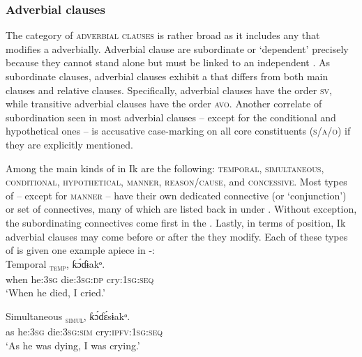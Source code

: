 \subsubsection{Adverbial clauses}\label{sec:10.3.3}

The category of \textsc{adverbial clauses} is rather broad as it includes any  that modifies a  adverbially. Adverbial clause are subordinate or ‘dependent’ precisely because they cannot stand alone but must be linked to an independent . As subordinate clauses, adverbial clauses exhibit a  that differs from both main clauses and relative clauses. Specifically,  adverbial clauses have the order \textsc{sv}, while transitive adverbial clauses have the order \textsc{avo}. Another correlate of subordination seen in most adverbial clauses – except for the conditional and hypothetical ones – is accusative case-marking on all core constituents (\textsc{s/a/o}) if they are explicitly mentioned. 

Among the main kinds of  in Ik are the following: \textsc{temporal}, \textsc{simultaneous}, \textsc{conditional}, \textsc{hypothetical}, \textsc{manner}, \textsc{reason}/\textsc{cause}, and \textsc{concessive}. Most types of  – except for \textsc{manner} – have their own dedicated connective (or ‘conjunction’) or set of connectives, many of which are listed back in  under . Without exception, the subordinating connectives come first in the . Lastly, in terms of position, Ik adverbial clauses may come before or after the  they modify. Each of these types of  is given one example apiece in -:\\



Temporal
\ea\label{ex:syn:37}
\textsc{\textsubscript{temp}},   ƙ\'{ɔ}ɗɨakᵒ. \\
when   he:\textsc{3sg}   die:\textsc{3sg:dp}     cry:\textsc{1sg:seq}    \\
\glt ‘When he died, I cried.’ 
\z



Simultaneous
\ea\label{ex:syn:38}
\textsc{\textsubscript{simul}},   ƙ\'{ɔ}ɗ\'{ɛ}sɨakᵒ. \\
as   he:\textsc{3sg}   die:\textsc{3sg:sim}    cry:\textsc{ipfv}:\textsc{1sg:seq}    \\
\glt ‘As he was dying, I was crying.’ 
\z



